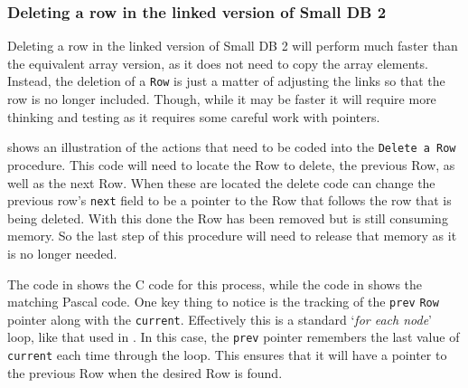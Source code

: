 
\begin{figure}[p]
\end{figure}

\begin{figure}[p]
\end{figure}


\clearpage
\subsubsection{Deleting a row in the linked version of Small DB 2} %
\label{ssub:deleting_a_row_in_the_linked_version_of_small_db_2}

Deleting a row in the linked version of Small DB 2 will perform much faster than the equivalent array version, as it does not need to copy the array elements. Instead, the deletion of a \texttt{Row} is just a matter of adjusting the links so that the row is no longer included. Though, while it may be faster it will require more thinking and testing as it requires some careful work with pointers.

 shows an illustration of the actions that need to be coded into the \texttt{Delete a Row} procedure. This code will need to locate the Row to delete, the previous Row, as well as the next Row. When these are located the delete code can change the previous row's \texttt{next} field to be a pointer to the Row that follows the row that is being deleted. With this done the Row has been removed but is still consuming memory. So the last step of this procedure will need to release that memory as it is no longer needed.

The code in  shows the C code for this process, while the code in  shows the matching Pascal code. One key thing to notice is the tracking of the \texttt{prev} \texttt{Row} pointer along with the \texttt{current}. Effectively this is a standard `\emph{for each node}' loop, like that used in . In this case, the \texttt{prev} pointer remembers the last value of \texttt{current} each time through the loop. This ensures that it will have a pointer to the previous Row when the desired Row is found.

